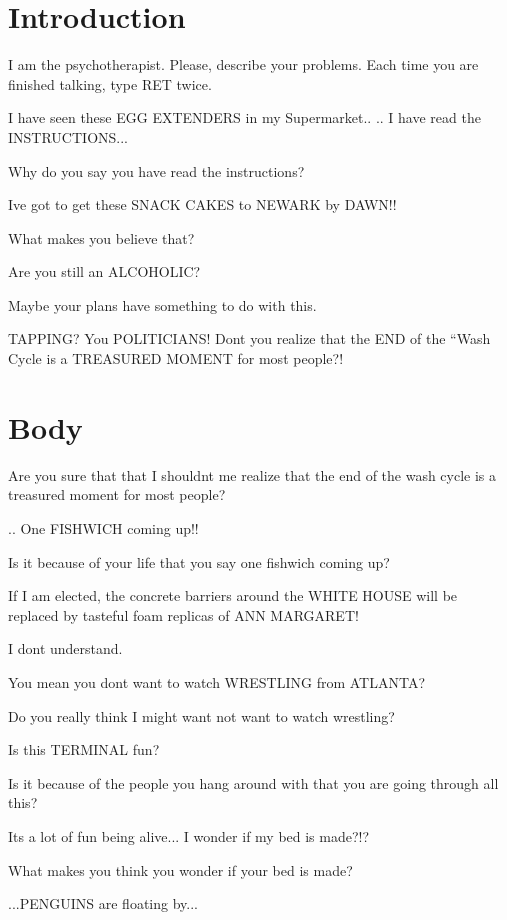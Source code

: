 \documentclass[cropmarks, frame, english]{idamasterthesis}
\author{AUTHOR}
\begin{document}

\makeintropages

\chapter{Introduction}

I am the psychotherapist.  Please, describe your problems.  Each time
you are finished talking, type RET twice.

I have seen these EGG EXTENDERS in my Supermarket..
 ..  I have read the INSTRUCTIONS...

Why do you say you have read the instructions?

Ive got to get these SNACK CAKES to NEWARK by DAWN!!

What makes you believe that?

Are you still an ALCOHOLIC?

Maybe your plans have something to do with this.

TAPPING?  You POLITICIANS!  Dont you realize that the END of the
 ``Wash Cycle is a TREASURED MOMENT for most people?!


\chapter{Body}

Are you sure that that I shouldnt me realize that the end of the wash
cycle is a treasured moment for most people?

..  One FISHWICH coming up!!

Is it because of your life that you say one fishwich coming up?

If I am elected, the concrete barriers around the WHITE HOUSE
 will be replaced by tasteful foam replicas of ANN MARGARET!

I dont understand.

You mean you dont want to watch WRESTLING from ATLANTA?

Do you really think I might want not want to watch wrestling?

Is this TERMINAL fun?

Is it because of the people you hang around with that you are going
through all this?

Its a lot of fun being alive...  I wonder if my bed is made?!?

What makes you think you wonder if your bed is made?

...PENGUINS are floating by...
\end{document}

